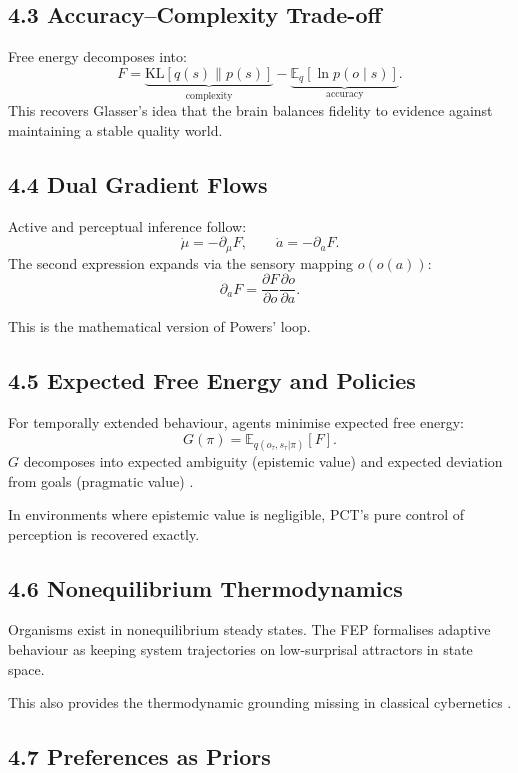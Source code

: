 \documentclass[11pt,a4paper,twoside]{article}
\begin{document}
\subsection*{4.3 Accuracy–Complexity Trade-off}

Free energy decomposes into:
\[
F = \underbrace{\mathrm{KL}[q(s)\|p(s)]}_{\text{complexity}}
    - \underbrace{\mathbb{E}_q[\ln p(o\mid s)]}_{\text{accuracy}}.
\]
This recovers Glasser’s idea that the brain balances fidelity to evidence
against maintaining a stable quality world.

\subsection*{4.4 Dual Gradient Flows}

Active and perceptual inference follow:
\[
\dot{\mu} = -\partial_\mu F, \qquad
\dot{a} = -\partial_a F.
\]
The second expression expands via the sensory mapping $o(o(a))$:
\[
\partial_a F = \frac{\partial F}{\partial o}\frac{\partial o}{\partial a}.
\]

This is the mathematical version of Powers’ loop.

\subsection*{4.5 Expected Free Energy and Policies}

For temporally extended behaviour,
agents minimise expected free energy:
\[
G(\pi) = \mathbb{E}_{q(o_\tau,s_\tau|\pi)}[F].
\]
$G$ decomposes into expected ambiguity (epistemic value)
and expected deviation from goals (pragmatic value)
\cite{friston2016deep,brown2013active}.

In environments where epistemic value is negligible,
PCT’s pure control of perception is recovered exactly.

\subsection*{4.6 Nonequilibrium Thermodynamics}

Organisms exist in nonequilibrium steady states.
The FEP formalises adaptive behaviour as keeping system trajectories on low-surprisal
attractors in state space.

This also provides the thermodynamic grounding missing in classical cybernetics
\cite{sengupta2016}.

\subsection*{4.7 Preferences as Priors}
\end{document}
